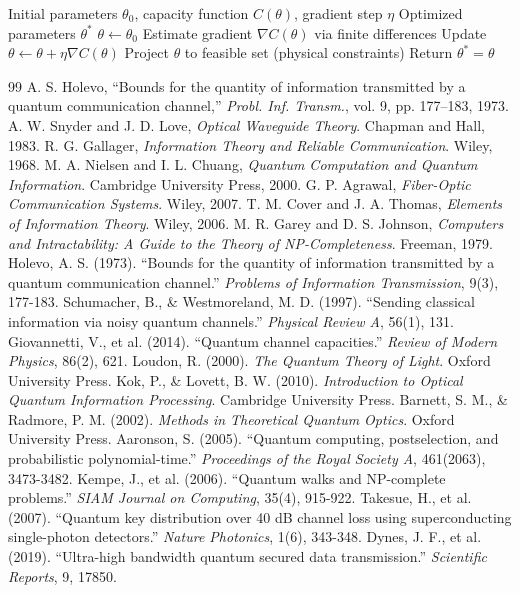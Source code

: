 \documentclass[12pt,a4paper]{article}
\begin{document}
\begin{algorithm}
\caption{Fiber Parameter Optimization}
\begin{algorithmic}[1]
\Require Initial parameters $\theta_0$, capacity function $C(\theta)$, gradient step $\eta$
\Ensure Optimized parameters $\theta^*$
\State $\theta \leftarrow \theta_0$
    \State Estimate gradient $\nabla C(\theta)$ via finite differences
    \State Update $\theta \leftarrow \theta + \eta \nabla C(\theta)$
    \State Project $\theta$ to feasible set (physical constraints)
\EndFor
\State Return $\theta^* = \theta$
\end{algorithmic}
\end{algorithm}


\begin{thebibliography}{99}
 A. S. Holevo, ``Bounds for the quantity of information transmitted by a quantum communication channel,'' \textit{Probl. Inf. Transm.}, vol. 9, pp. 177–183, 1973.
 A. W. Snyder and J. D. Love, \textit{Optical Waveguide Theory}. Chapman and Hall, 1983.
 R. G. Gallager, \textit{Information Theory and Reliable Communication}. Wiley, 1968.
 M. A. Nielsen and I. L. Chuang, \textit{Quantum Computation and Quantum Information}. Cambridge University Press, 2000.
 G. P. Agrawal, \textit{Fiber-Optic Communication Systems}. Wiley, 2007.
 T. M. Cover and J. A. Thomas, \textit{Elements of Information Theory}. Wiley, 2006.
 M. R. Garey and D. S. Johnson, \textit{Computers and Intractability: A Guide to the Theory of NP-Completeness}. Freeman, 1979.
\bibitem{} Holevo, A. S. (1973). ``Bounds for the quantity of information transmitted by a quantum communication channel.'' \textit{Problems of Information Transmission}, 9(3), 177-183.
\bibitem{} Schumacher, B., \& Westmoreland, M. D. (1997). ``Sending classical information via noisy quantum channels.'' \textit{Physical Review A}, 56(1), 131.
\bibitem{} Giovannetti, V., et al. (2014). ``Quantum channel capacities.'' \textit{Review of Modern Physics}, 86(2), 621.
\bibitem{}Loudon, R. (2000). \textit{The Quantum Theory of Light}. Oxford University Press.
\bibitem{}Kok, P., \& Lovett, B. W. (2010). \textit{Introduction to Optical Quantum Information Processing}. Cambridge University Press.
\bibitem{} Barnett, S. M., \& Radmore, P. M. (2002). \textit{Methods in Theoretical Quantum Optics}. Oxford University Press.
\bibitem{} Aaronson, S. (2005). ``Quantum computing, postselection, and probabilistic polynomial-time.'' \textit{Proceedings of the Royal Society A}, 461(2063), 3473-3482.
\bibitem{} Kempe, J., et al. (2006). ``Quantum walks and NP-complete problems.'' \textit{SIAM Journal on Computing}, 35(4), 915-922.
\bibitem{} Takesue, H., et al. (2007). ``Quantum key distribution over 40 dB channel loss using superconducting single-photon detectors.'' \textit{Nature Photonics}, 1(6), 343-348.
\bibitem{} Dynes, J. F., et al. (2019). ``Ultra-high bandwidth quantum secured data transmission.'' \textit{Scientific Reports}, 9, 17850.

\end{thebibliography}
\end{document}
